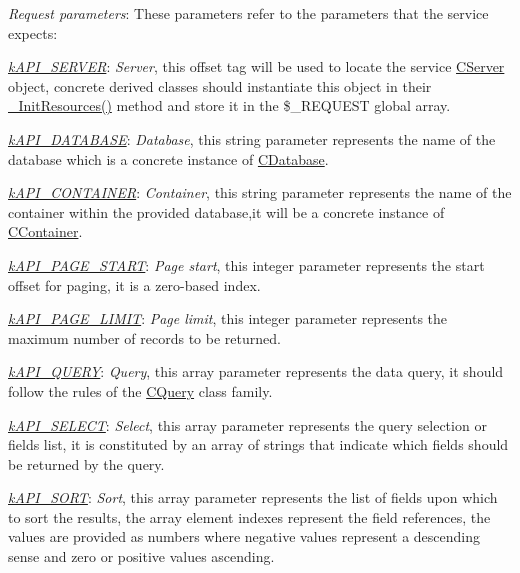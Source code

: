 \begin{DoxyItemize}
\item {\itshape Request parameters}\-: These parameters refer to the parameters that the service expects\-: 
\begin{DoxyItemize}
\item {\itshape \hyperlink{}{k\-A\-P\-I\-\_\-\-S\-E\-R\-V\-E\-R}}\-: {\itshape Server}, this offset tag will be used to locate the service \hyperlink{class_c_server}{C\-Server} object, concrete derived classes should instantiate this object in their \hyperlink{}{\-\_\-\-Init\-Resources()} method and store it in the {\ttfamily \$\-\_\-\-R\-E\-Q\-U\-E\-S\-T} global array. 
\item {\itshape \hyperlink{}{k\-A\-P\-I\-\_\-\-D\-A\-T\-A\-B\-A\-S\-E}}\-: {\itshape Database}, this string parameter represents the name of the database which is a concrete instance of \hyperlink{class_c_database}{C\-Database}. 
\item {\itshape \hyperlink{}{k\-A\-P\-I\-\_\-\-C\-O\-N\-T\-A\-I\-N\-E\-R}}\-: {\itshape Container}, this string parameter represents the name of the container within the provided database,it will be a concrete instance of \hyperlink{class_c_container}{C\-Container}. 
\item {\itshape \hyperlink{}{k\-A\-P\-I\-\_\-\-P\-A\-G\-E\-\_\-\-S\-T\-A\-R\-T}}\-: {\itshape Page start}, this integer parameter represents the start offset for paging, it is a zero-\/based index. 
\item {\itshape \hyperlink{}{k\-A\-P\-I\-\_\-\-P\-A\-G\-E\-\_\-\-L\-I\-M\-I\-T}}\-: {\itshape Page limit}, this integer parameter represents the maximum number of records to be returned. 
\item {\itshape \hyperlink{}{k\-A\-P\-I\-\_\-\-Q\-U\-E\-R\-Y}}\-: {\itshape Query}, this array parameter represents the data query, it should follow the rules of the \hyperlink{class_c_query}{C\-Query} class family. 
\item {\itshape \hyperlink{}{k\-A\-P\-I\-\_\-\-S\-E\-L\-E\-C\-T}}\-: {\itshape Select}, this array parameter represents the query selection or fields list, it is constituted by an array of strings that indicate which fields should be returned by the query. 
\item {\itshape \hyperlink{}{k\-A\-P\-I\-\_\-\-S\-O\-R\-T}}\-: {\itshape Sort}, this array parameter represents the list of fields upon which to sort the results, the array element indexes represent the field references, the values are provided as numbers where negative values represent a descending sense and zero or positive values ascending. 

\end{DoxyItemize}
\end{DoxyItemize}

